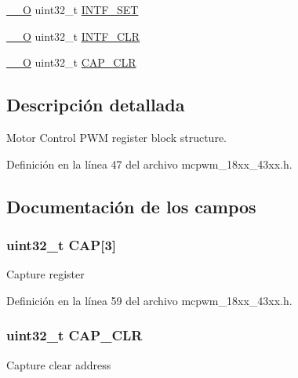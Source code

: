 \begin{DoxyCompactItemize}
\item 
\hyperlink{core__sc300_8h_a7e25d9380f9ef903923964322e71f2f6}{\+\_\+\+\_\+O} uint32\+\_\+t \hyperlink{struct_l_p_c___m_c_p_w_m___t_abdcdeb268573598c709e0c4fcfa95719}{I\+N\+T\+F\+\_\+\+S\+ET}
\item 
\hyperlink{core__sc300_8h_a7e25d9380f9ef903923964322e71f2f6}{\+\_\+\+\_\+O} uint32\+\_\+t \hyperlink{struct_l_p_c___m_c_p_w_m___t_a14cf2abcb9f72e3a14c52975cc24775a}{I\+N\+T\+F\+\_\+\+C\+LR}
\item 
\hyperlink{core__sc300_8h_a7e25d9380f9ef903923964322e71f2f6}{\+\_\+\+\_\+O} uint32\+\_\+t \hyperlink{struct_l_p_c___m_c_p_w_m___t_a756a46e93aff5bdb3f1222e491f111f6}{C\+A\+P\+\_\+\+C\+LR}
\end{DoxyCompactItemize}


\subsection{Descripción detallada}
Motor Control P\+WM register block structure. 

Definición en la línea 47 del archivo mcpwm\+\_\+18xx\+\_\+43xx.\+h.



\subsection{Documentación de los campos}
\subsubsection[{\texorpdfstring{C\+AP}{CAP}}]{ uint32\+\_\+t C\+AP\mbox{[}3\mbox{]}}\hypertarget{struct_l_p_c___m_c_p_w_m___t_ad2d6414d27cf1486d46ce182e665486b}{}\label{struct_l_p_c___m_c_p_w_m___t_ad2d6414d27cf1486d46ce182e665486b}
Capture register 

Definición en la línea 59 del archivo mcpwm\+\_\+18xx\+\_\+43xx.\+h.

\subsubsection[{\texorpdfstring{C\+A\+P\+\_\+\+C\+LR}{CAP_CLR}}]{ uint32\+\_\+t C\+A\+P\+\_\+\+C\+LR}\hypertarget{struct_l_p_c___m_c_p_w_m___t_a756a46e93aff5bdb3f1222e491f111f6}{}\label{struct_l_p_c___m_c_p_w_m___t_a756a46e93aff5bdb3f1222e491f111f6}
Capture clear address 

